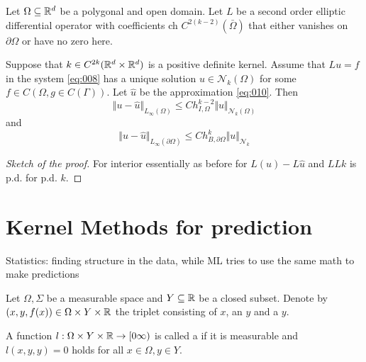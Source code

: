 \begin{theorem}\label{thm:1.32}
    Let $\Omega\subseteq \mathbb{R}^d$ be a polygonal and open domain. Let $L$
    be a second order elliptic differential operator with coefficients 
    ch $C^{2(k-2)}(\bar{\Omega})$ that either vanishes on $\partial \Omega$ or have no zero here.

    Suppose that $k\in C^{2k}(\mathbb{R}^d\times\mathbb{R}^d)$ is a positive definite kernel. Assume 
    that $Lu=f$ in the system \ref{eq:008} has a unique solution $u\in \mathcal{N}_k(\Omega)$
    for some $f\in C(\Omega,g\in C(\Gamma))$. Let $\hat{u}$ be the approximation \ref{eq:010}. Then 
    \[\Vert u-\hat{u}\Vert_{L_\infty(\Omega)}\leq C h_{I,\Omega}^{k-2}\Vert u\Vert_{\mathcal{N}_k(\Omega)}\]
    and 
    \[\Vert u-\hat{u}\Vert_{L_\infty(\partial\Omega)}\leq C h_{B,\partial\Omega}^k \Vert u\Vert_{\mathcal{N}_k}\]
\end{theorem}

\begin{proof}[Sketch of the proof]

    For interior essentially as before for  $L(u)-L\hat{u}$ and 
    $LLk$ is p.d. for p.d. $k$.

\end{proof}




\section{Kernel Methods for prediction}

\begin{aremark}
    Statistics: finding structure in the data, while ML tries to use the same math to make predictions
\end{aremark}

\begin{definition}\label{def:43}
    Let $\Omega,\Sigma$ be a measurable space and $Y\subseteq\mathbb{R}$ be a closed subset. 
    Denote by $(x,y,f(x))\in\Omega\times Y\times \mathbb{R}$ the triplet consisting of 
     $x$, an  $y$ and a  $y$.
    
    A function $l:\Omega\times Y\times \mathbb{R}\to [0\infty)$ is called a  if it is 
    measurable and $l(x,y,y)=0$ holds for all $x\in\Omega,y\in Y$.
\end{definition}

